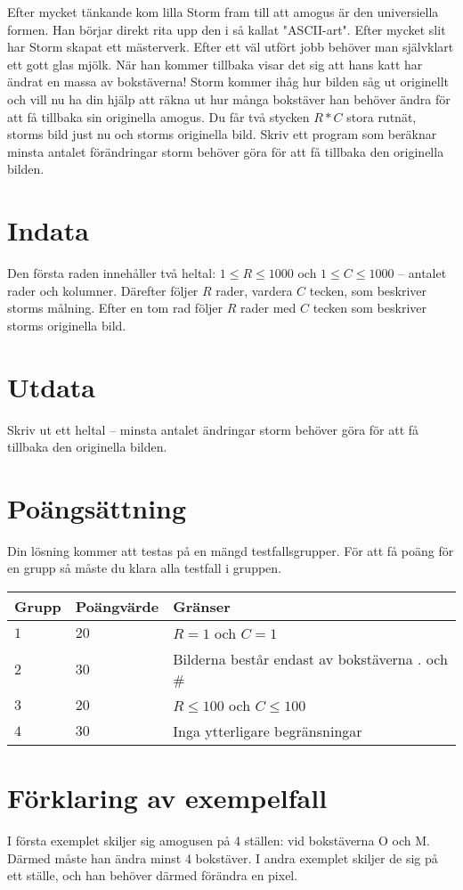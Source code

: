 Efter mycket tänkande kom lilla Storm fram till att amogus är den universiella formen. Han börjar direkt rita upp den
i så kallat "ASCII-art". Efter mycket slit har Storm skapat ett mästerverk. Efter ett väl utfört jobb behöver man
självklart ett gott glas mjölk. När han kommer tillbaka visar det sig att hans katt har ändrat en massa av bokstäverna!
Storm kommer ihåg hur bilden såg ut originellt och vill nu ha din hjälp att räkna ut hur många bokstäver han behöver ändra
för att få tillbaka sin originella amogus.
Du får två stycken $R*C$ stora rutnät, storms bild just nu och storms originella bild. Skriv ett program som beräknar
minsta antalet förändringar storm behöver göra för att få tillbaka den originella bilden.

\section*{Indata}
Den första raden innehåller två heltal: $1\leq R \leq 1000$ och $1 \leq C \leq 1000$ -- antalet rader och kolumner.
Därefter följer $R$ rader, vardera $C$ tecken, som beskriver storms målning. 
Efter en tom rad följer $R$ rader med $C$ tecken som beskriver storms originella bild. 

\section*{Utdata}
Skriv ut ett heltal -- minsta antalet ändringar storm behöver göra för att få tillbaka den originella bilden.

\section*{Poängsättning}
Din lösning kommer att testas på en mängd testfallsgrupper.
För att få poäng för en grupp så måste du klara alla testfall i gruppen.

\noindent
\begin{tabular}{| l | l | p{12cm} |}
  \hline
  Grupp & Poängvärde & Gränser \\ \hline
  $1$   & $20$       & $R=1$ och $C=1$ \\ \hline
  $2$   & $30$       & Bilderna består endast av bokstäverna . och \#\\ \hline
  $3$   & $20$       & $R \leq 100$ och $C \leq 100$  \\ \hline
  $4$   & $30$       & Inga ytterligare begränsningar  \\ \hline
\end{tabular}

\section*{Förklaring av exempelfall}
I första exemplet skiljer sig amogusen på 4 ställen: vid bokstäverna O och M. Därmed måste han ändra minst 4 bokstäver.
I andra exemplet skiljer de sig på ett ställe, och han behöver därmed förändra en pixel.